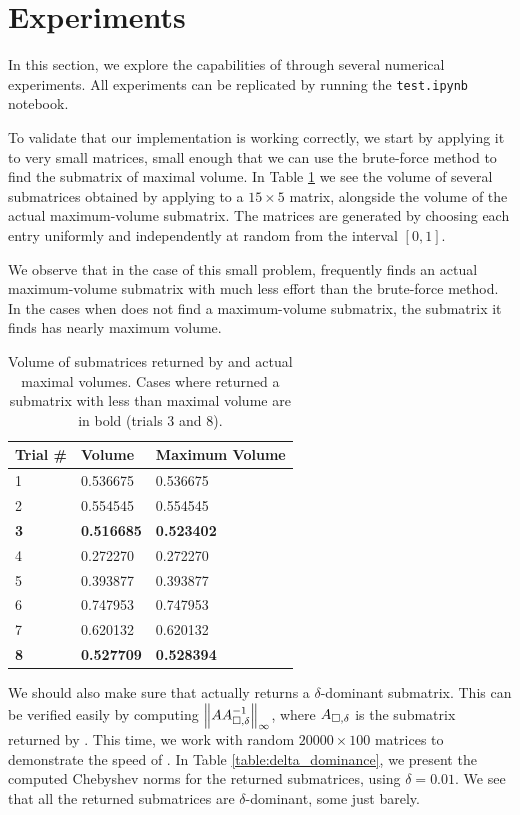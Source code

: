 \documentclass{article}
\begin{document}
	\section{Experiments}
	
	In this section, we explore the capabilities of \maxvol{} through several numerical experiments. All experiments can be replicated by running the \texttt{test.ipynb} notebook.
	
	
	To validate that our implementation is working correctly, we start by applying it to very small matrices, small enough that we can use the brute-force method to find the submatrix of maximal volume. In Table \ref{table:validation} we see the volume of several submatrices obtained by applying \maxvol{} to a $15\times 5$ matrix, alongside the volume of the actual maximum-volume submatrix. The matrices are generated by choosing each entry uniformly and independently at random from the interval $[0,1]$.
	
	We observe that in the case of this small problem, \maxvol{} frequently finds an actual maximum-volume submatrix with much less effort than the brute-force method. In the cases when \maxvol{} does not find a maximum-volume submatrix, the submatrix it finds has nearly maximum volume.
	
	\begin{table}[h]
		\centering
		\begin{tabular}{@{}lll@{}}
			\toprule
			Trial \# & \maxvol{} Volume & Maximum Volume \\
			\midrule
			1 & 0.536675 & 0.536675\\
			2 & 0.554545 & 0.554545\\
			\bf 3 & \bf 0.516685 & \bf 0.523402\\
			4 & 0.272270 & 0.272270\\
			5 & 0.393877 & 0.393877\\
			6 & 0.747953 & 0.747953\\
			7 & 0.620132 & 0.620132\\
			\bf 8 & \bf 0.527709 & \bf 0.528394\\
			\bottomrule
		\end{tabular}
		\caption{Volume of submatrices returned by \maxvol{} and actual maximal volumes. Cases where \maxvol{} returned a submatrix with less than maximal volume are in bold (trials 3 and 8).}
		\label{table:validation}
	\end{table}
	
	We should also make sure that \maxvol{} actually returns a $\delta$-dominant submatrix. This can be verified easily by computing $\left\lVert AA_{\square,\delta}^{-1} \right\rVert_\infty$, where $A_{\square,\delta}$ is the submatrix returned by \maxvol{}. This time, we work with random $20000\times 100$ matrices to demonstrate the speed of \maxvol{}. In Table \ref{table:delta_dominance}, we present the computed Chebyshev norms for the returned submatrices, using $\delta = 0.01$. We see that all the returned submatrices are $\delta$-dominant, some just barely.
	
\end{document}
